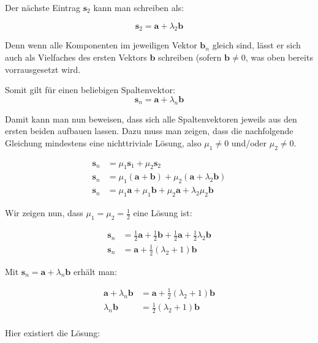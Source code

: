 \documentclass[a4paper,german,12pt,smallheadings]{scrartcl}
\begin{document}
Der nächste Eintrag $\mathbf{s}_2$ kann man schreiben als:

\begin{equation*}
  \mathbf{s}_2 = \mathbf{a} + \lambda_2 \mathbf{b}
\end{equation*}

Denn wenn alle Komponenten im jeweiligen Vektor $\mathbf{b}_n$ gleich sind,
lässt er sich auch als Vielfaches des ersten Vektors $\mathbf{b}$ schreiben
(sofern $\mathbf{b} \neq 0$, was oben bereits vorrausgesetzt wird.

Somit gilt für einen beliebigen Spaltenvektor:
\begin{equation*}
  \mathbf{s}_n = \mathbf{a} + \lambda_n \mathbf{b}
\end{equation*}

Damit kann man nun beweisen, dass sich alle Spaltenvektoren jeweils aus den
ersten beiden aufbauen lassen. Dazu muss man zeigen, dass die nachfolgende
Gleichung mindestens eine nichttriviale Lösung, also $\mu_1 \neq 0$ und/oder
$\mu_2 \neq 0$.

\begin{align*}
  \mathbf{s}_n &= \mu_1 \mathbf{s}_1 + \mu_2 \mathbf{s}_2 \\
  \mathbf{s}_n &= \mu_1 (\mathbf{a} + \mathbf{b}) + \mu_2(\mathbf{a} + \lambda_2 \mathbf{b}) \\
  \mathbf{s}_n &= \mu_1 \mathbf{a} + \mu_1 \mathbf{b} + \mu_2 \mathbf{a} + \lambda_2\mu_2\mathbf{b}
\end{align*}

Wir zeigen nun, dass $\mu_1 = \mu_2 = \frac{1}{2}$ eine Lösung ist:

\begin{align*}
  \mathbf{s}_n &= \frac{1}{2} \mathbf{a} + \frac{1}{2} \mathbf{b} + \frac{1}{2} \mathbf{a} + \frac{1}{2} \lambda_2\mathbf{b} \\
  \mathbf{s}_n &= \mathbf{a} + \frac{1}{2} (\lambda_2+1)\mathbf{b}
\end{align*}

Mit $\mathbf{s}_n = \mathbf{a} + \lambda_n \mathbf{b}$ erhält man:

\begin{align*}
 \mathbf{a} + \lambda_n \mathbf{b} &= \mathbf{a} + \frac{1}{2} (\lambda_2+1)\mathbf{b} \\
 \lambda_n \mathbf{b} &= \frac{1}{2} (\lambda_2+1)\mathbf{b} \\
\end{align*}

Hier existiert die Lösung:
\end{document}
